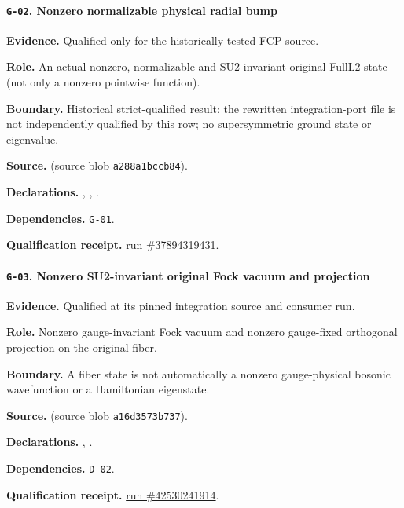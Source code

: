 \paragraph{\texttt{G-02}. Nonzero normalizable physical radial bump}
\noindent\textbf{Evidence.} Qualified only for the historically tested FCP source.
\par\noindent\textbf{Role.} An actual nonzero, normalizable and SU2-invariant original FullL2 state (not only a nonzero pointwise function).
\par\noindent\textbf{Boundary.} Historical strict-qualified result; the rewritten integration-port file is not independently qualified by this row; no supersymmetric ground state or eigenvalue.
\par\noindent\textbf{Source.}  (source blob \texttt{a288a1bccb84}).
\par\noindent\textbf{Declarations.} , , .
\par\noindent\textbf{Dependencies.} \texttt{G-01}.
\par\noindent\textbf{Qualification receipt.} \href{https://github.com/etblink/Foundational-Convergence-Program/actions/runs/37894319431}{run \#37894319431}.
\medskip

\paragraph{\texttt{G-03}. Nonzero SU2-invariant original Fock vacuum and projection}
\noindent\textbf{Evidence.} Qualified at its pinned integration source and consumer run.
\par\noindent\textbf{Role.} Nonzero gauge-invariant Fock vacuum and nonzero gauge-fixed orthogonal projection on the original fiber.
\par\noindent\textbf{Boundary.} A fiber state is not automatically a nonzero gauge-physical bosonic wavefunction or a Hamiltonian eigenstate.
\par\noindent\textbf{Source.}  (source blob \texttt{a16d3573b737}).
\par\noindent\textbf{Declarations.} , .
\par\noindent\textbf{Dependencies.} \texttt{D-02}.
\par\noindent\textbf{Qualification receipt.} \href{https://github.com/etblink/math/actions/runs/42530241914}{run \#42530241914}.
\medskip

